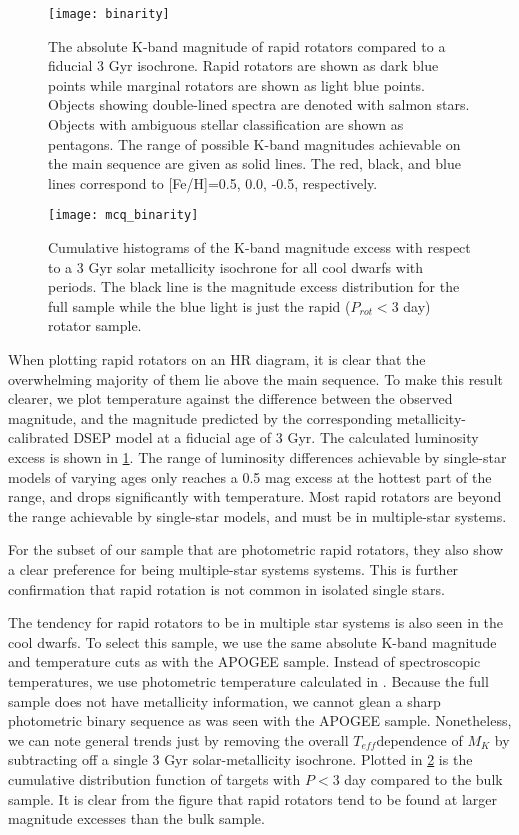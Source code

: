 \documentclass[manuscript]{aastex6}
\newcommand{\Teff}{\ensuremath{T_{eff}}}
\begin{document}
\begin{figure}[htb]
  \centering
  \texttt{[image: binarity]}
  \caption{The absolute K-band magnitude of rapid rotators compared to a 
  fiducial 3 Gyr isochrone. Rapid rotators are shown as dark blue points
while marginal rotators are shown as light blue points. Objects showing
double-lined spectra are denoted with salmon stars. Objects with
ambiguous stellar classification are shown as pentagons. The range of
possible K-band magnitudes achievable on the main sequence are given as
solid lines. The red, black, and blue lines correspond to [Fe/H]=0.5,
0.0, -0.5, respectively.}
  \label{fig:binarity}
\end{figure}

\begin{figure}[htb]
  \centering
  \texttt{[image: mcq\_binarity]}
  \caption{Cumulative histograms of the K-band magnitude excess with respect to
      a 3 Gyr solar metallicity isochrone for all cool dwarfs with 
      \citet{McQuillan14} periods. The black line is the magnitude excess
      distribution for the full sample while the blue light is just the rapid
  (\(P_{rot} < 3\) day) rotator sample.\label{fig:mcqbinarity}}
\end{figure}


When plotting rapid rotators on an HR diagram, it is clear that the
overwhelming majority of them lie above the main sequence. To make this
result clearer, we plot temperature against the difference between the
observed magnitude, and the magnitude predicted by the corresponding
metallicity-calibrated DSEP model at a fiducial age of 3 Gyr. The
calculated luminosity excess is shown in \cref{fig:binarity}. The range
of luminosity differences achievable by single-star models of varying
ages only reaches a 0.5 mag excess at the hottest part of the range, and
drops significantly with temperature. Most rapid rotators are beyond the
range achievable by single-star models, and must be in multiple-star
systems.

For the subset of our sample that are photometric rapid rotators, they
also show a clear preference for being multiple-star systems systems.
This is further confirmation that rapid rotation is not common in
isolated single stars.

The tendency for rapid rotators to be in multiple star systems is also
seen in the \citet{McQuillan14} cool dwarfs. To select this sample, we
use the same absolute K-band magnitude and temperature cuts as with the
APOGEE sample. Instead of spectroscopic temperatures, we use photometric 
temperature calculated in \citet{Mathur17}. Because the full \citet{McQuillan14} 
sample does not have metallicity information, we cannot glean a sharp
photometric binary sequence as was seen with the APOGEE sample. Nonetheless,
we can note general trends just by removing the overall \Teff dependence of
\(M_K\) by subtracting off  a single 3 Gyr solar-metallicity
isochrone. Plotted in \cref{fig:mcqbinarity} is the cumulative distribution
function of \citet{McQuillan14} targets with \(P < 3\) day compared to the bulk
sample. It is clear from the figure that rapid rotators tend to be found at
larger magnitude excesses than the bulk sample.
\end{document}

